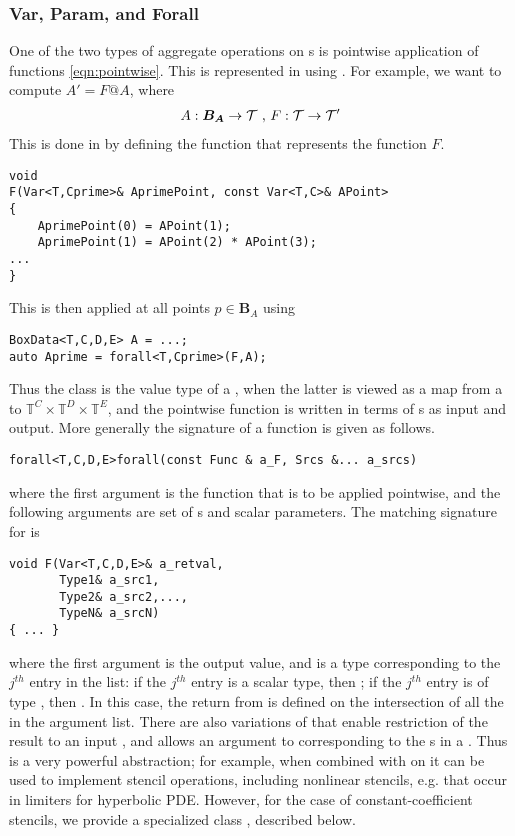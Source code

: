 \documentclass[12pt]{article}
\newcommand{\BoxData}{\code{BoxData} }
\begin{document}
\subsubsection*{Var, Param, and Forall}

One of the two types of aggregate operations on s is pointwise application of functions \eqref{eqn:pointwise}. This is represented in \libname using 
. For example, we want to compute $A' = F@A$, where
\begin{gather*}
A:\boldsymbol{B_A} \rightarrow \mathcal{T} \hbox{ , } F:\mathcal{T} \rightarrow \mathcal{T}'
\end{gather*}
This is done in \libname by defining the function  that represents the function $F$.
\begin{verbatim}
void 
F(Var<T,Cprime>& AprimePoint, const Var<T,C>& APoint>
{
	AprimePoint(0) = APoint(1); 
	AprimePoint(1) = APoint(2) * APoint(3);
...
}
\end{verbatim}
This is then applied at all points $p \in \boldsymbol{B}_A$ using 
\begin{verbatim}
BoxData<T,C,D,E> A = ...;
auto Aprime = forall<T,Cprime>(F,A);
\end{verbatim}
Thus the class  is the value type of a \BoxData , when the latter is viewed as a map from a  to $\mathbb{T}^C \times \mathbb{T}^D \times \mathbb{T}^E$, and the pointwise function  is written in terms of s as input and output. More generally the signature of a  function is given as follows.
\begin{verbatim}
forall<T,C,D,E>forall(const Func & a_F, Srcs &... a_srcs) 
\end{verbatim} 
where the first argument is the function  that is to be applied pointwise, and the following arguments are set of s and scalar parameters. The matching signature for  is 
\begin{verbatim}
void F(Var<T,C,D,E>& a_retval,
       Type1& a_src1,
       Type2& a_src2,...,
       TypeN& a_srcN)
{ ... }
\end{verbatim}
where the first argument is the output value, and
 is a type corresponding to the $j^{th}$ entry in the   list: if the $j^{th}$ entry is a scalar type, then ; if the  $j^{th}$ entry is of type , then . In this case, the return  from  is defined on the intersection of all the  in the argument list. There are also variations of  that enable restriction of the result to an input , and allows an argument to  corresponding to the s in a . Thus  is a very powerful abstraction; for example, when combined with  on  it can be used to implement stencil operations, including nonlinear stencils, e.g. that occur in limiters for hyperbolic PDE. However, for the case of constant-coefficient stencils, we provide a specialized class , described below. 
\end{document}
